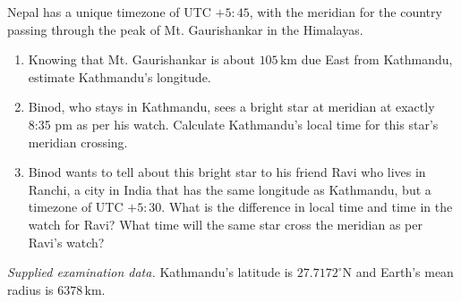 Nepal has a unique timezone of UTC $+5{:}45$, with the meridian for the country passing through the peak of Mt. Gaurishankar in the Himalayas.
\begin{enumerate}
\item Knowing that Mt. Gaurishankar is about $105\,\mathrm{km}$ due East from Kathmandu, estimate Kathmandu's longitude.
\item Binod, who stays in Kathmandu, sees a bright star at meridian at exactly 8:35 pm as per his watch. Calculate Kathmandu's local time for this star's meridian crossing.
\item Binod wants to tell about this bright star to his friend Ravi who lives in Ranchi, a city in India that has the same longitude as Kathmandu, but a timezone of UTC $+5{:}30$. What is the difference in local time and time in the watch for Ravi? What time will the same star cross the meridian as per Ravi's watch?
\end{enumerate}
\textit{Supplied examination data.} Kathmandu's latitude is $27.7172^\circ\mathrm{N}$ and Earth's mean radius is $6378\,\mathrm{km}$.
